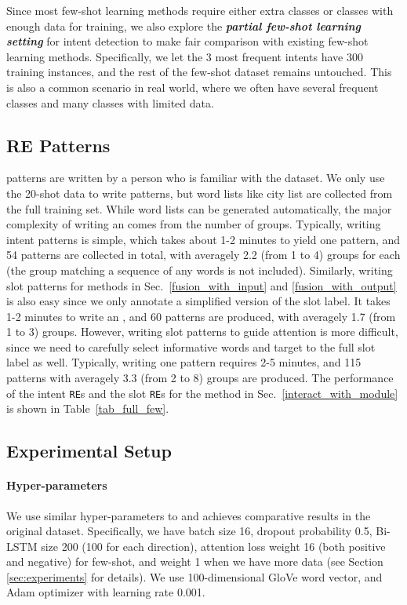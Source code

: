 Since most few-shot learning methods require either extra classes or classes with enough data for training, we also explore the \textbf{\emph{partial few-shot learning setting}} for intent detection to make fair comparison with existing few-shot learning methods. Specifically, we let the 3 most frequent intents have 300 training instances, and the rest of the few-shot dataset remains untouched.
This is also a common scenario in real world, where we often have several frequent classes and many classes with limited data.

\subsection{RE Patterns}
\label{re_in_exp}
\RE patterns are written by a person who is familiar with the dataset.
We only use the 20-shot data to write \RE patterns, but word lists like city list are collected from the full training set. 
While word lists can be generated automatically, the major complexity of writing an \RE comes from the number of groups.
Typically, writing intent patterns is simple, which takes about 1-2 minutes to yield one pattern, and 54 patterns are collected in total, with averagely 2.2 (from 1 to 4) groups for each \RE (the group matching a sequence of any words is not included). 
Similarly, writing slot patterns for methods in Sec.~\ref{fusion_with_input} and \ref{fusion_with_output} is also easy since we only annotate a simplified version of the slot label. It takes 1-2 minutes to write an \RE, and 60 patterns are produced, with averagely 1.7 (from 1 to 3) groups.
However, writing slot patterns to guide attention is more difficult, since we need to carefully select informative words and target to the full slot label as well. Typically, writing one pattern requires 2-5 minutes, and 115 patterns with averagely 3.3 (from 2 to 8) groups are produced.
The performance of the intent \texttt{RE}s and the slot \texttt{RE}s for the method in Sec.~\ref{interact_with_module} is shown in Table~\ref{tab_full_few}.


\subsection{Experimental Setup}
\paragraph{Hyper-parameters}
We use similar hyper-parameters to \cite{liu2016attention} and achieves comparative results in the original dataset. Specifically, we have batch size 16, dropout probability 0.5, Bi-LSTM size 200 (100 for each direction), attention loss weight 16 (both positive and negative) for few-shot, and weight 1 when we have more data (see Section \ref{sec:experiments} for details). We use 100-dimensional GloVe \cite{pennington2014glove} word vector, and Adam optimizer \cite{kingma2014adam} with learning rate 0.001.

